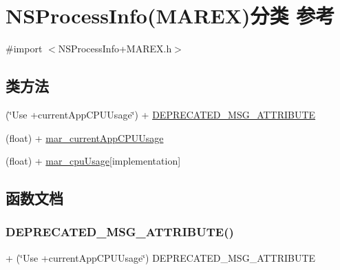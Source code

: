 \hypertarget{category_n_s_process_info_07_m_a_r_e_x_08}{}\section{N\+S\+Process\+Info(M\+A\+R\+EX)分类 参考}
\label{category_n_s_process_info_07_m_a_r_e_x_08}


{\ttfamily \#import $<$N\+S\+Process\+Info+\+M\+A\+R\+E\+X.\+h$>$}

\subsection*{类方法}
\begin{DoxyCompactItemize}
\item 
(\char`\"{}Use +current\+App\+C\+P\+U\+Usage\char`\"{}) + \hyperlink{category_n_s_process_info_07_m_a_r_e_x_08_a73d02eb3a934a07d52a12feb86bf076d}{D\+E\+P\+R\+E\+C\+A\+T\+E\+D\+\_\+\+M\+S\+G\+\_\+\+A\+T\+T\+R\+I\+B\+U\+TE}
\item 
(float) + \hyperlink{category_n_s_process_info_07_m_a_r_e_x_08_a4ef18cdfec3c496ffc5d95c44d472281}{mar\+\_\+current\+App\+C\+P\+U\+Usage}
\item 
(float) + \hyperlink{category_n_s_process_info_07_m_a_r_e_x_08_a822d28bc395bb8cfab378612a99a4aa4}{mar\+\_\+cpu\+Usage}{\ttfamily  \mbox{[}implementation\mbox{]}}
\end{DoxyCompactItemize}


\subsection{函数文档}
\mbox{\label{category_n_s_process_info_07_m_a_r_e_x_08_a73d02eb3a934a07d52a12feb86bf076d}} 
\subsubsection{\texorpdfstring{D\+E\+P\+R\+E\+C\+A\+T\+E\+D\+\_\+\+M\+S\+G\+\_\+\+A\+T\+T\+R\+I\+B\+U\+T\+E()}{DEPRECATED\_MSG\_ATTRIBUTE()}}
{\footnotesize\ttfamily + (\char`\"{}Use +current\+App\+C\+P\+U\+Usage\char`\"{}) D\+E\+P\+R\+E\+C\+A\+T\+E\+D\+\_\+\+M\+S\+G\+\_\+\+A\+T\+T\+R\+I\+B\+U\+TE \begin{DoxyParamCaption}{ }\end{DoxyParamCaption}}

